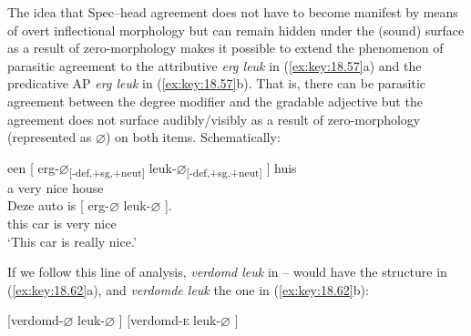 \documentclass[output=paper]{langsci/langscibook}
\begin{document}
The idea that Spec--head agreement does not have to become manifest by means of
overt inflectional morphology but can remain hidden under the (sound) surface
as a result of zero-morphology makes it possible to extend the phenomenon of
parasitic agreement to the attributive \emph{erg leuk} in (\ref{ex:key:18.57}a) and
the predicative AP \emph{erg leuk} in (\ref{ex:key:18.57}b). That is, there can be
parasitic agreement between the degree modifier and the gradable adjective but
the agreement does not surface audibly/visibly as a result of zero-morphology
(represented as ${\varnothing}$) on both items. Schematically:

\ea%
    \label{ex:key:18.61}
	\ea
	\gll een [ erg-${\varnothing}$\textsubscript{[-def,+sg,+neut]} leuk-${\varnothing}$\textsubscript{[-def,+sg,+neut]} ] huis\\
    a   {}     very                        nice                         {}     house\\
	\ex
	\gll Deze  auto    is  [ erg-${\varnothing}$    leuk-${\varnothing}$ ].\\
        this    car      is {} very        nice {}\\
	\glt \enquote*{This car is really nice.}
	\z
\z

If we follow this line of analysis, \emph{verdomd leuk} in
-- would have the structure in
(\ref{ex:key:18.62}a), and \emph{verdomde leuk} the one in (\ref{ex:key:18.62}b):

\ea%
    \label{ex:key:18.62}
    \ea {}[verdomd-${\varnothing}$  leuk-${\varnothing}$ ]
	\ex {}[verdomd-\textsc{e}    leuk-${\varnothing}$ ]
	\z
\z
\end{document}
